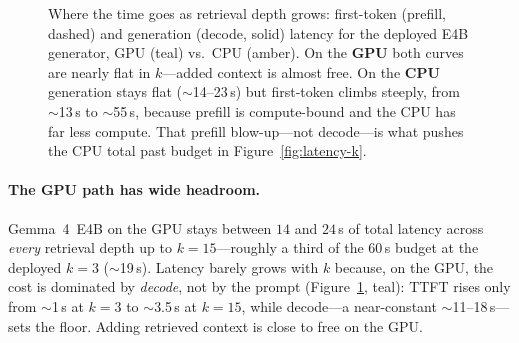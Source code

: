 \begin{figure}[t]
\centering
{}
\caption{Where the time goes as retrieval depth grows: first-token (prefill,
dashed) and generation (decode, solid) latency for the deployed E4B generator,
GPU (teal) vs.\ CPU (amber). On the \textbf{GPU} both curves are nearly flat in
$k$---added context is almost free. On the \textbf{CPU} generation stays flat
($\sim$14--23\,s) but first-token climbs steeply, from $\sim$13\,s to
$\sim$55\,s, because prefill is compute-bound and the CPU has far less compute.
That prefill blow-up---not decode---is what pushes the CPU total past budget in
Figure~\ref{fig:latency-k}.}
\label{fig:latency-decomp}
\end{figure}

\paragraph{The GPU path has wide headroom.} Gemma~4~E4B on the GPU stays
between $14$ and $24$\,s of total latency across \emph{every} retrieval depth up
to $k=15$---roughly a third of the 60\,s budget at the deployed $k=3$
($\sim$19\,s). Latency barely grows with $k$ because, on the GPU, the cost is
dominated by \emph{decode}, not by the prompt
(Figure~\ref{fig:latency-decomp}, teal): TTFT rises only from $\sim$1\,s at
$k=3$ to $\sim$3.5\,s at $k=15$, while decode---a near-constant
$\sim$11--18\,s---sets the floor. Adding retrieved context is close to free on
the GPU.

